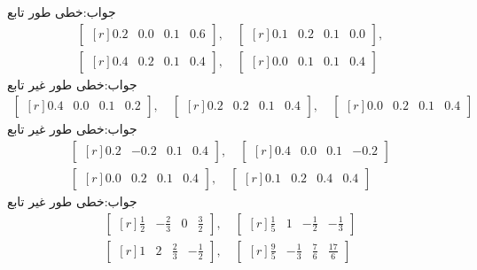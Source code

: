 جواب:خطی طور تابع
\begin{align*}
\begin{bmatrix*}[r] 
0.2&0.0&0.1&0.6
\end{bmatrix*},\quad \begin{bmatrix*}[r] 
0.1&0.2&0.1&0.0
\end{bmatrix*},\\
 \begin{bmatrix*}[r] 
0.4&0.2&0.1&0.4
\end{bmatrix*},\quad \begin{bmatrix*}[r] 
0.0&0.1&0.1&0.4
\end{bmatrix*}
\end{align*}
جواب:خطی طور غیر تابع
\begin{align*}
\begin{bmatrix*}[r] 
0.4&0.0&0.1&0.2
\end{bmatrix*},\quad \begin{bmatrix*}[r] 
0.2&0.2&0.1&0.4
\end{bmatrix*},\quad \begin{bmatrix*}[r] 
0.0&0.2&0.1&0.4
\end{bmatrix*}
\end{align*}
جواب:خطی طور غیر تابع
\begin{align*}
\begin{bmatrix*}[r] 
0.2&-0.2&0.1&0.4
\end{bmatrix*},\quad \begin{bmatrix*}[r] 
0.4&0.0&0.1&-0.2
\end{bmatrix*}\\
\begin{bmatrix*}[r] 
0.0&0.2&0.1&0.4
\end{bmatrix*},\quad \begin{bmatrix*}[r] 
0.1&0.2&0.4&0.4
\end{bmatrix*}
\end{align*}
جواب:خطی طور غیر تابع
\begin{align*}
\begin{bmatrix*}[r] 
\frac{1}{2}&-\frac{2}{3}&0&\frac{3}{2}
\end{bmatrix*},\quad \begin{bmatrix*}[r] 
\frac{1}{5}&1&-\frac{1}{2}&-\frac{1}{3}
\end{bmatrix*}\\
\begin{bmatrix*}[r] 
1&2&\frac{2}{3}&-\frac{1}{2}
\end{bmatrix*},\quad \begin{bmatrix*}[r] 
\frac{9}{5}&-\frac{1}{3}&\frac{7}{6}&\frac{17}{6}
\end{bmatrix*}
\end{align*}
